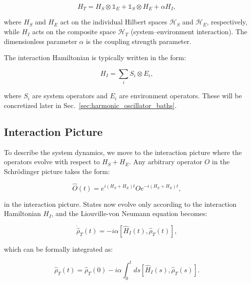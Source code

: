 \begin{equation}
	H_T = H_S \otimes \mathds{1}_E + \mathds{1}_S \otimes H_E + \alpha H_I,
	\label{eq:Total_Hamiltonian}
\end{equation}

\noindent
where $H_S$ and $H_E$ act on the individual Hilbert spaces $\mathcal{H}_S$ and $\mathcal{H}_E$, respectively, while $H_I$ acts on the composite space $\mathcal{H}_T$ (system--environment interaction). The dimensionless parameter $\alpha$ is the coupling strength parameter.

\noindent The interaction Hamiltonian is typically written in the form:

\begin{equation}
	H_I = \sum_i S_i \otimes E_i,
	\label{eq:Interaction_Hamiltonian}
\end{equation}

\noindent
where $S_i$ are system operators and $E_i$ are environment operators. These will be concretized later in Sec.~\ref{sec:harmonic_oscillator_baths}.

\subsection{Interaction Picture}

\noindent
To describe the system dynamics, we move to the interaction picture where the operators evolve with respect to $H_S + H_E$. Any arbitrary operator $O$ in the Schrödinger picture takes the form:

\begin{equation}
	\hat{O}(t) = e^{i(H_S+H_E)t} O e^{-i(H_S+H_E)t},
	\label{eq:Interaction_Picture_Operators}
\end{equation}

\noindent
in the interaction picture. States now evolve only according to the interaction Hamiltonian $H_I$, and the Liouville-von Neumann equation becomes:

\begin{equation}
	\dot{\hat{\rho}}_T(t) = -i \alpha [\hat{H}_I(t), \hat{\rho}_T(t)],
	\label{eq:LiouvilleVN}
\end{equation}

\noindent
which can be formally integrated as:

\begin{equation}
	\hat{\rho}_T(t) = \hat{\rho}_T(0) - i \alpha \int_0^t ds [\hat{H}_I(s), \hat{\rho}_T(s)].
	\label{eq:Formal_Integration}
\end{equation}

